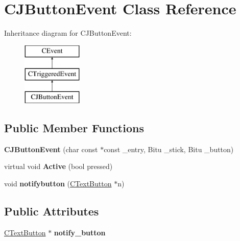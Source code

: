 \hypertarget{classCJButtonEvent}{\section{C\-J\-Button\-Event Class Reference}
\label{classCJButtonEvent}
}
Inheritance diagram for C\-J\-Button\-Event\-:\begin{figure}[H]
\begin{center}
\leavevmode
\includegraphics[height=3.000000cm]{classCJButtonEvent}
\end{center}
\end{figure}
\subsection*{Public Member Functions}
\begin{DoxyCompactItemize}
\item 
\hypertarget{classCJButtonEvent_a1e52758b5a23171097f00bae1acf028a}{{\bfseries C\-J\-Button\-Event} (char const $\ast$const \-\_\-entry, Bitu \-\_\-stick, Bitu \-\_\-button)}\label{classCJButtonEvent_a1e52758b5a23171097f00bae1acf028a}

\item 
\hypertarget{classCJButtonEvent_ad3be3de6af81cfbcf569e2d9bcee7e84}{virtual void {\bfseries Active} (bool pressed)}\label{classCJButtonEvent_ad3be3de6af81cfbcf569e2d9bcee7e84}

\item 
\hypertarget{classCJButtonEvent_adc04a0aadec5744e0408c5e780d54d6b}{void {\bfseries notifybutton} (\hyperlink{classCTextButton}{C\-Text\-Button} $\ast$n)}\label{classCJButtonEvent_adc04a0aadec5744e0408c5e780d54d6b}

\end{DoxyCompactItemize}
\subsection*{Public Attributes}
\begin{DoxyCompactItemize}
\item 
\hypertarget{classCJButtonEvent_ac8c89511fdc9a86b4c187eec432445d2}{\hyperlink{classCTextButton}{C\-Text\-Button} $\ast$ {\bfseries notify\-\_\-button}}\label{classCJButtonEvent_ac8c89511fdc9a86b4c187eec432445d2}

\end{DoxyCompactItemize}
